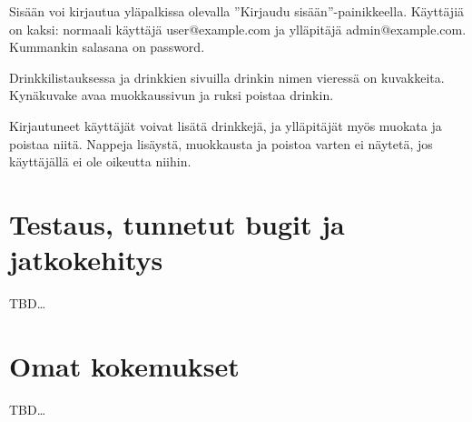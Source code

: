 \documentclass[a4paper]{article}
\begin{document}
Sisään voi kirjautua yläpalkissa olevalla ''Kirjaudu sisään''-painikkeella. Käyttäjiä on kaksi: normaali käyttäjä user@example.com ja ylläpitäjä admin@example.com. Kummankin salasana on password.

Drinkkilistauksessa ja drinkkien sivuilla drinkin nimen vieressä on kuvakkeita. Kynäkuvake avaa muokkaussivun ja ruksi poistaa drinkin.

Kirjautuneet käyttäjät voivat lisätä drinkkejä, ja ylläpitäjät myös muokata ja poistaa niitä. Nappeja lisäystä, muokkausta ja poistoa varten ei näytetä, jos käyttäjällä ei ole oikeutta niihin.

\section{Testaus, tunnetut bugit ja jatkokehitys}
TBD\ldots{}

\section{Omat kokemukset}
TBD\ldots{}
\end{document}
